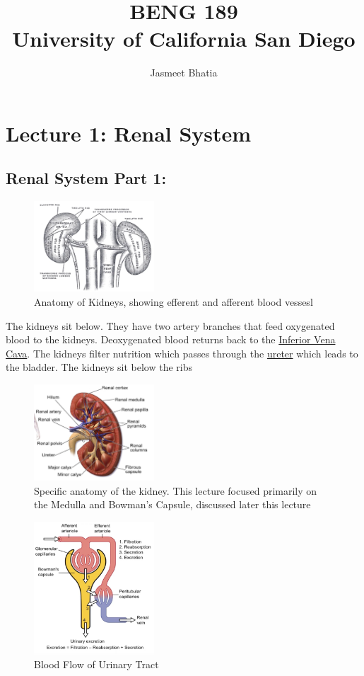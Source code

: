 \documentclass{report}
\title{\Huge{BENG 189}\\University of California San Diego}
\author{\huge{Jasmeet Bhatia}}
\date{}
\begin{document}
\maketitle
\newpage%
\tableofcontents
\pagebreak

\chapter{Lecture 1: Renal System}
\section{Renal System Part 1:}
\begin{figure}[htbp]
  \centering
  \includegraphics[width=0.4\textwidth]{img1.png}
  \caption{Anatomy of Kidneys, showing efferent and afferent blood vessesl}
\end{figure}
The kidneys sit below. They have two artery branches that feed oxygenated blood to the kidneys. Deoxygenated blood returns back to the \underline{Inferior Vena Cava}. The kidneys filter nutrition which passes through the \underline{ureter} which leads to the bladder. The kidneys sit below the ribs
\begin{figure}[htbp]
  \centering
  \includegraphics[width=0.4\textwidth]{img2.png}
  \caption{Specific anatomy of the kidney. This lecture focused primarily on the Medulla and Bowman's Capsule, discussed later this lecture}
\end{figure}
\begin{figure}[htbp]
  \centering
  \includegraphics[width=0.4\textwidth]{img3.png}
  \caption{Blood Flow of Urinary Tract}
\end{figure}
\end{document}
